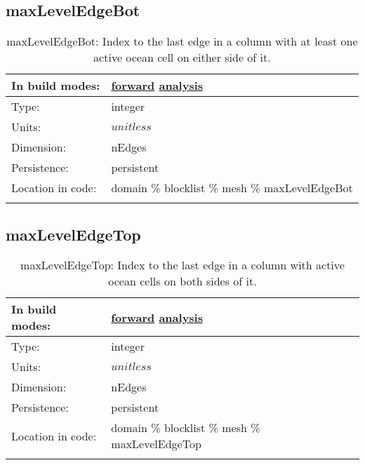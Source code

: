 \subsection[maxLevelEdgeBot]{maxLevelEdgeBot}
\label{subsec:var_sec_mesh_maxLevelEdgeBot}
\begin{center}
\begin{longtable}{| p{2.0in} | p{4.0in} |}
        \hline 
        In build modes: & \hyperref[subsec:forward_var_tab_mesh]{forward} \hyperref[subsec:analysis_var_tab_mesh]{analysis} \\
        \hline 
        Type: & integer \\
        \hline 
        Units: & $unitless$ \\
        \hline 
        Dimension: & nEdges \\
        \hline 
        Persistence: & persistent \\
        \hline 
		 Location in code: & domain \% blocklist \% mesh \% maxLevelEdgeBot \\
		 \hline 
    \caption{maxLevelEdgeBot: Index to the last edge in a column with at least one active ocean cell on either side of it.}
\end{longtable}
\end{center}
\subsection[maxLevelEdgeTop]{maxLevelEdgeTop}
\label{subsec:var_sec_mesh_maxLevelEdgeTop}
\begin{center}
\begin{longtable}{| p{2.0in} | p{4.0in} |}
        \hline 
        In build modes: & \hyperref[subsec:forward_var_tab_mesh]{forward} \hyperref[subsec:analysis_var_tab_mesh]{analysis} \\
        \hline 
        Type: & integer \\
        \hline 
        Units: & $unitless$ \\
        \hline 
        Dimension: & nEdges \\
        \hline 
        Persistence: & persistent \\
        \hline 
		 Location in code: & domain \% blocklist \% mesh \% maxLevelEdgeTop \\
		 \hline 
    \caption{maxLevelEdgeTop: Index to the last edge in a column with active ocean cells on both sides of it.}
\end{longtable}
\end{center}
